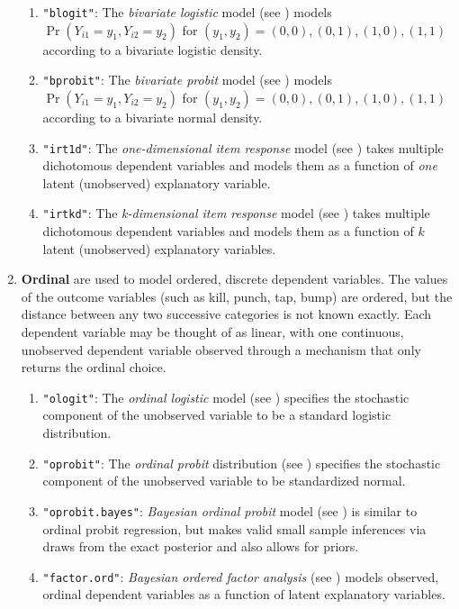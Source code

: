 \begin{enumerate}
\begin{enumerate}
   \item {\tt "blogit"}: The {\it bivariate logistic} model (see
     ) models $\Pr(Y_{i1} = y_1, Y_{i2} = y_2)$ for
$(y_1, y_2) = {(0,0), (0,1), (1,0), (1,1)}$ according 
to a bivariate logistic density.
   \item {\tt "bprobit"}: The {\it bivariate probit} model (see
     ) models $\Pr(Y_{i1} = y_1, Y_{i2} = y_2)$ for
$(y_1, y_2) = {(0,0), (0,1), (1,0), (1,1)}$ according to a bivariate normal density.  
   \item {\tt "irt1d"}: The {\it one-dimensional item response} model
(see ) takes multiple dichotomous dependent variables and models
them as a function of \emph{one} latent (unobserved) explanatory variable.  
   \item {\tt "irtkd"}:  The {\it k-dimensional item response} model
(see ) takes multiple dichotomous dependent variables and models
them as a function of $k$ latent (unobserved) explanatory variables.  
\end{enumerate} 
 \item {\bf  Ordinal} are used to model
   ordered, discrete dependent variables.  The values of the outcome
   variables (such as kill, punch, tap, bump) are ordered, but the
   distance between any two successive categories is not known
   exactly.  Each dependent variable may be thought of as linear, with
one continuous, unobserved dependent variable observed through a mechanism
   that only returns the ordinal choice.
   \begin{enumerate}
   \item {\tt "ologit"}: The {\it ordinal logistic} model (see
     ) specifies the stochastic component of the
     unobserved variable to be a standard logistic distribution.
   \item {\tt "oprobit"}: The {\it ordinal probit} distribution (see
     ) specifies the stochastic component of the
     unobserved variable to be standardized normal.
      \item {\tt "oprobit.bayes"}: {\it Bayesian ordinal probit} model
(see ) is similar to ordinal probit
regression, but makes valid small sample inferences via draws from the
exact posterior and also allows for priors.  
     \item {\tt "factor.ord"}: {\it Bayesian ordered factor analysis}
(see ) models observed, ordinal dependent variables
as a function of latent explanatory variables.  
   \end{enumerate}

\end{enumerate}
